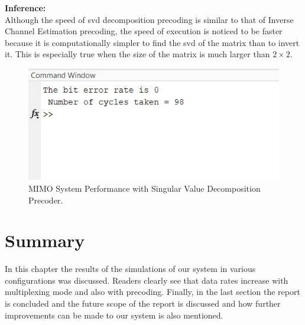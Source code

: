 \textbf{Inference:}\\
Although the speed of \acrshort{svd} decomposition precoding is similar to that of Inverse Channel Estimation precoding, the speed of execution is noticed to be faster because it is computationally simpler to find the \acrshort{svd} of the matrix than to invert it. This is especially true when the size of the matrix is much larger than $2 \times 2$.

\begin{figure}[!htbp]
\centering
\includegraphics[scale=1]{Chapter 4/Figures/MIMO System Performance Inverse Channel Estimation}
\caption{MIMO System Performance with Singular Value Decomposition Precoder.}
\label{fig:mimo system performance singular value decomposition}
\end{figure}

\section*{Summary}
In this chapter the results of the simulations of our system in various configurations was discussed. Readers clearly see that data rates increase with multiplexing mode and also with precoding. Finally, in the last section the report is concluded and the future scope of the report is discussed and how further improvements can be made to our system is also mentioned.




